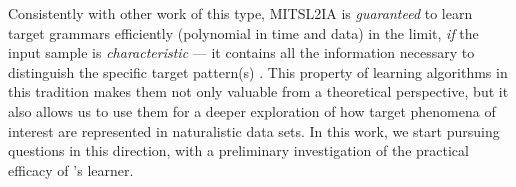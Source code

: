 \documentclass[11pt]{article}
\begin{document}
Consistently with other work of this type, MITSL2IA is \emph{guaranteed} to learn target grammars efficiently (polynomial in time and data) in the limit, \emph{if} the input sample is \emph{characteristic} --- it contains all the information necessary to distinguish the specific target pattern(s)  \citep{Higuera2010grammatical}.
This property of learning algorithms in this tradition makes them not only valuable from a theoretical perspective, but it also allows us to use them for a deeper exploration of how target phenomena of interest are represented in naturalistic data sets.\@
In this work, we start pursuing questions in this direction, with a preliminary investigation of the practical efficacy of \citet{de2021learning}'s learner.

\end{document}
